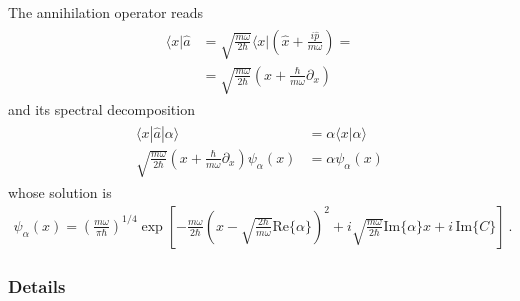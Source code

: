 \documentclass[letterpaper,10pt,english]{jupyterBook}
\begin{document}
\sphinxAtStartPar
The annihilation operator reads
\begin{equation*}
\begin{split}\begin{aligned}
  \langle x | \hat{a} 
  & = \sqrt{\frac{m \omega}{2 \hbar}}\langle x | \left( \hat{x} + \frac{i \hat{p}}{m \omega} \right) = \\
  & = \sqrt{\frac{m \omega}{2 \hbar}} \left( x + \frac{\hbar}{m \omega} \partial_x \right)
\end{aligned}\end{split}
\end{equation*}
\sphinxAtStartPar
and its spectral decomposition
\begin{equation*}
\begin{split}\begin{aligned}
  \langle x | \hat{a} | \alpha \rangle & = \alpha \langle x | \alpha \rangle \\
  \sqrt{\frac{m \omega}{2 \hbar}} \left( x + \frac{\hbar}{m \omega} \partial_x \right) \psi_\alpha(x) & = \alpha \psi_\alpha(x)
\end{aligned}\end{split}
\end{equation*}
\sphinxAtStartPar
whose solution is
\begin{equation*}
\begin{split}\psi_\alpha(x) = \left( \frac{m \omega}{\pi \hbar} \right)^{1/4} \exp \left[ -\frac{m \omega}{2 \hbar} \left( x - \sqrt{\frac{2 \hbar}{m \omega}} \text{Re}\{ \alpha \} \right)^2 + i \sqrt{\frac{m \omega}{2 \hbar}} \text{Im}\{ \alpha \} x + i \, \text{Im}\{ C \} \right] \ .\end{split}
\end{equation*}\subsubsection*{Details}
\end{document}
